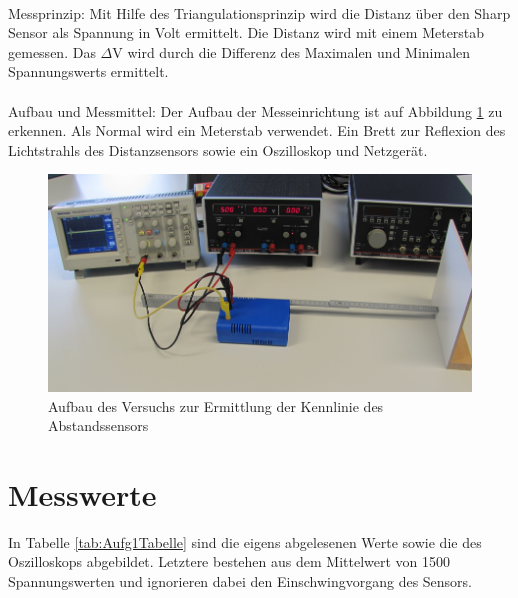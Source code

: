 \documentclass[12pt,oneside,a4paper]{report}
\begin{document}
\paragraph{} Messprinzip: Mit Hilfe des Triangulationsprinzip wird die Distanz über den Sharp Sensor als Spannung in Volt ermittelt. Die Distanz wird mit einem Meterstab gemessen. 
Das $\Delta$V wird durch die Differenz des Maximalen und Minimalen Spannungswerts ermittelt.

\paragraph{} Aufbau und Messmittel: Der Aufbau der Messeinrichtung ist auf Abbildung \ref{fig:VersuchsAufbauAufg1} zu erkennen. Als Normal wird ein Meterstab verwendet. Ein Brett zur Reflexion des Lichtstrahls des Distanzsensors sowie ein Oszilloskop und Netzgerät.

\begin{figure}[H]
	\centering\small
	\includegraphics[width=\textwidth]{src/VersuchsAufbauAufg1.png}
	\caption{Aufbau des  Versuchs zur Ermittlung der Kennlinie des Abstandssensors}
	\label{fig:VersuchsAufbauAufg1}
\end{figure}


\section{Messwerte}
\label{chap:VERSUCH_1_MESSWERTE}

In Tabelle \ref{tab:Aufg1Tabelle} sind die eigens abgelesenen Werte sowie die des Oszilloskops abgebildet. Letztere bestehen aus dem Mittelwert von 1500 Spannungswerten und ignorieren dabei den Einschwingvorgang des Sensors.
\end{document}
